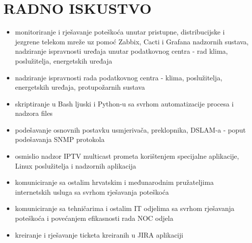 \documentclass{cv}
\begin{document}
\section{RADNO ISKUSTVO}
\begin{itemize}
    \setlength\itemsep{0.1cm}
    \item monitoriranje i rješavanje poteškoća unutar pristupne, distribucijske i jezgrene telekom mreže uz pomoć Zabbix, Cacti i Grafana nadzornih sustava, nadziranje ispravnosti uređaja unutar podatkovnog centra - rad klima, poslužitelja, energetskih uređaja
    \item nadziranje ispravnosti rada podatkovnog centra - klima, poslužitelja, energetskih uređaja, protupožarnih sustava
    \item skriptiranje u Bash ljuski i Python-u sa svrhom automatizacije procesa i nadzora
files
    \item podešavanje osnovnih postavku usmjerivača, preklopnika, DSLAM-a - poput podešavanja SNMP protokola
    \item osmislio nadzor IPTV multicast prometa korištenjem specijalne aplikacije, Linux poslužitelja i nadzornih aplikacija
    \item komuniciranje sa ostalim hrvatskim i međunarodnim pružateljima internetskih usluga sa svrhom rješavanja poteškoća
    \item komuniciranje sa tehničarima i ostalim IT odjelima sa svrhom rješavanja poteškoća i povećanjem efikasnosti rada NOC odjela
    \item kreiranje i rješavanje ticketa kreiranih u JIRA aplikaciji
\end{itemize}
\end{document}
